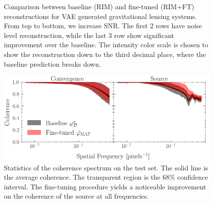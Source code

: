\begin{figure}[t!]
        \centering
        \caption{
        Comparison between baseline (RIM) and fine-tuned (RIM+FT) reconstructions for VAE generated 
        gravitational lensing systems. 
        From top to bottom, we increase SNR. The first 2 
        rows have noise level reconstruction, while the last 3 row show significant improvement 
        over the baseline. The intensity color scale is chosen to show the reconstruction
down to the third decimal place, where the baseline prediction breaks down.}
        \label{fig:increasing SNR}
\end{figure}

\begin{figure}[t!]
        \centering
        \includegraphics[width=0.7\linewidth]{figures/coherence_spectrum}
        \caption{Statistics of the coherence spectrum on the test set. The solid line is the average 
        coherence. The transparent region is the $68\%$ confidence interval. The fine-tuning 
        procedure yields a noticeable improvement on the coherence of the source at all frequencies.}
        \label{fig:coherence}
\end{figure}


